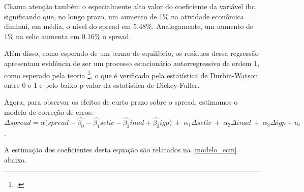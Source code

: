 \documentclass[a4paper,
               article,
               12pt,
               openany,
               oneside,
               english,
               brazil]{abntex2}
\numberwithin{equation}{section}
\begin{document}
    Chama atenção também o especialmente alto valor do coeficiente da variável ibc, significando que, no longo prazo, um aumento de 1\% na atividade econômica diminui, em média, o nível do spread em 5.48\%. Analogamente, um aumento de 1\% na selic aumenta em 0.16\% o spread.

    Além disso, como esperado de um termo de equilíbrio, os resíduos dessa regressão apresentam evidência de ser um processo estacionário autorregressivo de ordem 1, como esperado pela teoria \footcite[12]{coint1}, o que é verificado pela estatística de Durbin-Watson entre 0 e 1 e pelo baixo p-valor da estatística de Dickey-Fuller.

    Agora, para observar os efeitos de curto prazo sobre o spread, estimamos o modelo de correção de erros: $ \Delta \textit{spread} = \alpha (\textit{spread} - \hat{\beta_0} - \hat{\beta_1} \textit{selic} -\hat{\beta_2} \textit{inad} + \hat{\beta_3} \textit{igp)}\ +\ \alpha_1 \Delta \textit{selic}\ +\ \alpha_2 \Delta \textit{inad}\ +\ \alpha_3 \Delta \textit{igp} + u_t $.

    A estimação dos coeficientes desta equação são relatados na \autoref{modelo_ecm} abaixo.
\end{document}
